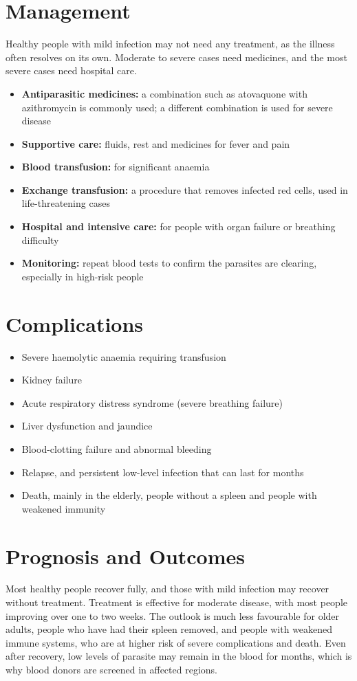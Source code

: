 \section*{Management}
Healthy people with mild infection may not need any treatment, as the illness often resolves on its own. Moderate to severe cases need medicines, and the most severe cases need hospital care.

\begin{itemize}
    \item \textbf{Antiparasitic medicines:} a combination such as atovaquone with azithromycin is commonly used; a different combination is used for severe disease
    \item \textbf{Supportive care:} fluids, rest and medicines for fever and pain
    \item \textbf{Blood transfusion:} for significant anaemia
    \item \textbf{Exchange transfusion:} a procedure that removes infected red cells, used in life-threatening cases
    \item \textbf{Hospital and intensive care:} for people with organ failure or breathing difficulty
    \item \textbf{Monitoring:} repeat blood tests to confirm the parasites are clearing, especially in high-risk people
\end{itemize}

\section*{Complications}
\begin{itemize}
    \item Severe haemolytic anaemia requiring transfusion
    \item Kidney failure
    \item Acute respiratory distress syndrome (severe breathing failure)
    \item Liver dysfunction and jaundice
    \item Blood-clotting failure and abnormal bleeding
    \item Relapse, and persistent low-level infection that can last for months
    \item Death, mainly in the elderly, people without a spleen and people with weakened immunity
\end{itemize}

\section*{Prognosis and Outcomes}
Most healthy people recover fully, and those with mild infection may recover without treatment. Treatment is effective for moderate disease, with most people improving over one to two weeks. The outlook is much less favourable for older adults, people who have had their spleen removed, and people with weakened immune systems, who are at higher risk of severe complications and death. Even after recovery, low levels of parasite may remain in the blood for months, which is why blood donors are screened in affected regions.

